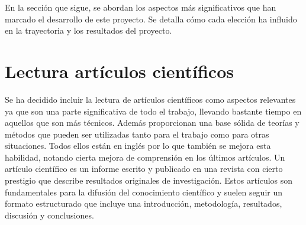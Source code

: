 En la sección que sigue, se abordan los aspectos más significativos que han marcado el desarrollo de este proyecto. Se detalla cómo cada elección ha influido en la trayectoria y los resultados del proyecto.
\section{Lectura artículos científicos}
Se ha decidido incluir la lectura de artículos científicos como aspectos relevantes ya que son una parte significativa de todo el trabajo, llevando bastante tiempo en aquellos que son más técnicos. Además proporcionan una base sólida de teorías y métodos que pueden ser utilizadas tanto para el trabajo como para otras situaciones. Todos ellos están en inglés por lo que también se mejora esta habilidad, notando cierta mejora de comprensión en los últimos artículos.
Un artículo científico es un informe escrito y publicado en una revista con cierto prestigio que describe resultados originales de investigación. Estos artículos son fundamentales para la difusión del conocimiento científico y suelen seguir un formato estructurado que incluye una introducción, metodología, resultados, discusión y conclusiones.

